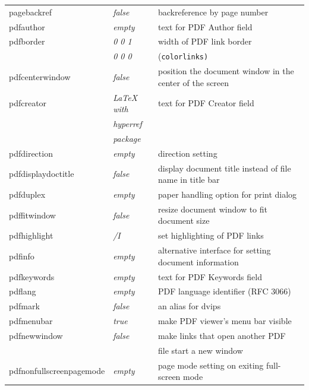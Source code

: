 \documentclass[pdftex]{article}
\begin{document}
\begin{longtable}{@{}>{\ttfamily}llp{7cm}@{}}
pagebackref        & \textit{false}         & backreference by page number \\
pdfauthor          & \textit{empty}         & text for PDF Author field \\
pdfborder          & \textit{0 0 1}         & width of PDF link border \\
                   & \textit{0 0 0}         & (\texttt{colorlinks)} \\
pdfcenterwindow    & \textit{false}         & position the document window in the center of the screen \\
pdfcreator         & \textit{LaTeX with}    & text for PDF Creator field \\
                   & \textit{hyperref}      & \\
                   & \textit{package}       & \\
pdfdirection       & \textit{empty}         & direction setting \\
pdfdisplaydoctitle & \textit{false}         & display document title instead
                                              of file name in title bar\\
pdfduplex          & \textit{empty}         & paper handling option for
                                              print dialog\\
pdffitwindow       & \textit{false}         & resize document window to fit document size \\
pdfhighlight       & \textit{/I}            & set highlighting of PDF links \\
pdfinfo            & \textit{empty}         & alternative interface for setting document information\\
pdfkeywords        & \textit{empty}         & text for PDF Keywords field \\
pdflang            & \textit{empty}         & PDF language identifier (RFC 3066) \\
pdfmark            & \textit{false}         & an alias for \textsf{dvips} \\
pdfmenubar         & \textit{true}          & make PDF viewer's menu bar visible \\
pdfnewwindow       & \textit{false}         & make links that open another PDF \\
                   &                        & file start a new window \\
pdfnonfullscreenpagemode
                   & \textit{empty}         & page mode setting on exiting
                                              full-screen mode\\

\end{longtable}
\end{document}
